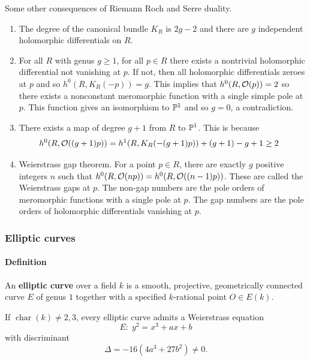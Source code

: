 \documentclass[12pt]{article}
\begin{document}
\begin{remark}
    Some other consequences of Riemann Roch and Serre duality. \begin{enumerate}
        \item The degree of the canonical bundle $K_R$ is $2g-2$ and there are $g$ independent holomorphic differentials on $R$.
        \item For all $R$ with genus $g \geq 1$, for all $p\in R$ there exists a nontrivial holomorphic differential not vanishing at $p$. If not, then all holomorphic differentials zeroes at $p$ and so $h^0(R, K_R(-p)) = g$. This implies that $h^0(R,\cO(p)) = 2$ so there exists a nonconstant meromorphic function with a single simple pole at $p$. This function gives an isomorphism to $\P^1$ and so $g=0$, a contradiction.
        \item There exists a map of degree $g+1$ from $R$ to $\P^1$. This is because \begin{align*}
                  h^0(R, \cO((g+1)p)) & = h^1(R, K_R(- (g+1)p)) + (g+1) - g + 1 \geq 2
              \end{align*}
        \item Weierstrass gap theorem. For a point $p\in R$, there are exactly $g$ positive integers $n$ such that $h^0(R, \cO(np)) = h^0(R, \cO((n-1)p))$. These are called the Weierstrass gaps at $p$. The non-gap numbers are the pole orders of meromorphic functions with a single pole at $p$. The gap numbers are the pole orders of holomorphic differentials vanishing at $p$.
    \end{enumerate}
\end{remark}

\subsubsection{Elliptic curves}

\paragraph{Definition}
An \textbf{elliptic curve} over a field $k$ is a smooth, projective, geometrically connected curve $E$ of genus $1$ together with a specified $k$-rational point $O \in E(k)$.

If $\operatorname{char}(k)\neq 2,3$, every elliptic curve admits a Weierstrass equation
\[
    E:\; y^2 = x^3 + ax + b
\]
with discriminant
\[
    \Delta = -16(4a^3 + 27b^2)\neq 0.
\]
\end{document}
